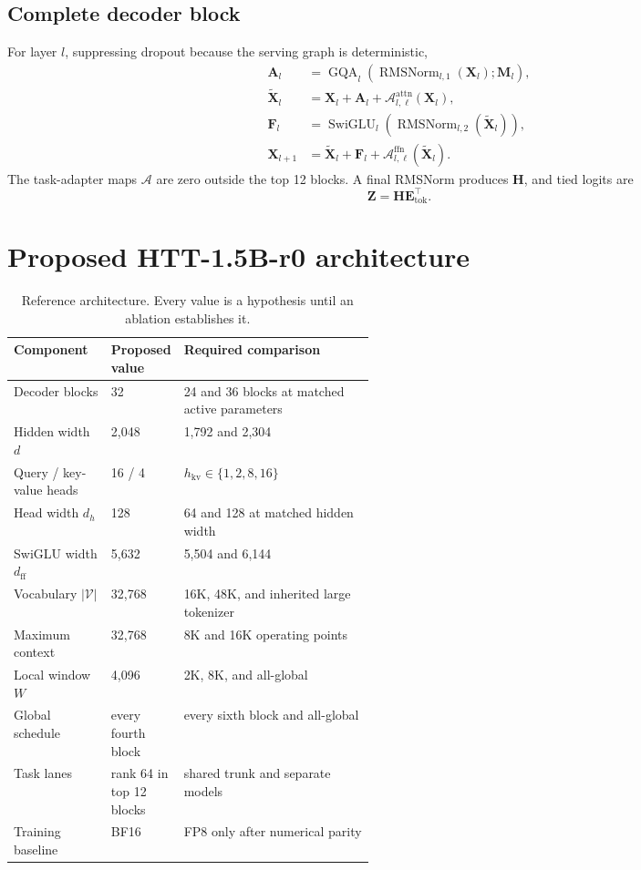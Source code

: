 \documentclass[10pt,letterpaper]{article}
\newcommand{\1}{\mathbb{1}}
\newcommand{\mat}[1]{\bm{#1}}
\begin{document}
\subsection{Complete decoder block}

For layer $l$, suppressing dropout because the serving graph is deterministic,
\begin{align}
  \mat A_l
  &=\operatorname{GQA}_l\!\left(\operatorname{RMSNorm}_{l,1}(\mat X_l);\mat M_l\right),\\
  \widetilde{\mat X}_l
  &=\mat X_l+\mat A_l+\mathcal A^{\mathrm{attn}}_{l,\ell}(\mat X_l),\\
  \mat F_l
  &=\operatorname{SwiGLU}_l\!\left(\operatorname{RMSNorm}_{l,2}(\widetilde{\mat X}_l)\right),\\
  \mat X_{l+1}
  &=\widetilde{\mat X}_l+\mat F_l
    +\mathcal A^{\mathrm{ffn}}_{l,\ell}(\widetilde{\mat X}_l).
  \label{eq:full-block}
\end{align}
The task-adapter maps $\mathcal A$ are zero outside the top 12 blocks.  A final RMSNorm produces
$\mat H$, and tied logits are
\begin{equation}
  \mat Z=\mat H\mat E_{\mathrm{tok}}^\top.
  \label{eq:tied-logits}
\end{equation}

\section{Proposed HTT-1.5B-r0 architecture}

\begin{table}[t]
\centering
\caption{Reference architecture.  Every value is a hypothesis until an ablation establishes it.}
\label{tab:architecture}
\small
\begin{tabularx}{\linewidth}{@{}L{0.27\linewidth}L{0.19\linewidth}Y@{}}
\toprule
Component & Proposed value & Required comparison \\
\midrule
Decoder blocks & 32 & 24 and 36 blocks at matched active parameters \\
Hidden width $d$ & 2,048 & 1,792 and 2,304 \\
Query / key-value heads & 16 / 4 & $h_{\mathrm{kv}}\in\{1,2,8,16\}$ \\
Head width $d_h$ & 128 & 64 and 128 at matched hidden width \\
SwiGLU width $d_{\mathrm{ff}}$ & 5,632 & 5,504 and 6,144 \\
Vocabulary $|\mathcal V|$ & 32,768 & 16K, 48K, and inherited large tokenizer \\
Maximum context & 32,768 & 8K and 16K operating points \\
Local window $W$ & 4,096 & 2K, 8K, and all-global \\
Global schedule & every fourth block & every sixth block and all-global \\
Task lanes & rank 64 in top 12 blocks & shared trunk and separate models \\
Training baseline & BF16 & FP8 only after numerical parity \\
\bottomrule
\end{tabularx}
\end{table}
\end{document}
